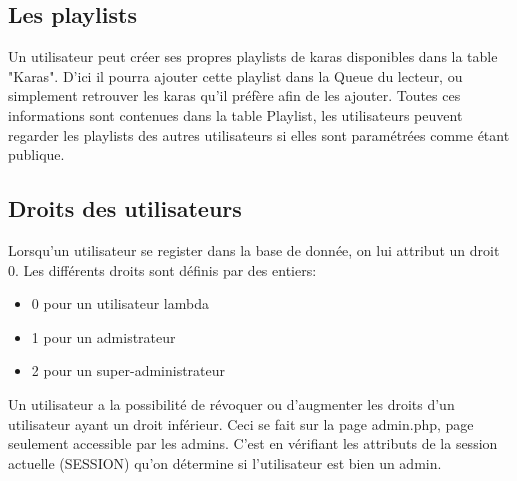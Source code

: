 \subsection{Les playlists}

Un utilisateur peut créer ses propres playlists de karas disponibles dans la table "Karas". D'ici il pourra ajouter cette playlist dans la Queue du lecteur, ou simplement retrouver les karas qu'il préfère afin de les ajouter. Toutes ces informations sont contenues dans la table Playlist, les utilisateurs peuvent regarder les playlists des autres utilisateurs si elles sont paramétrées comme étant publique.\newline

\subsection{Droits des utilisateurs}
Lorsqu'un utilisateur se register dans la base de donnée, on lui attribut un droit 0. Les différents droits sont définis par des entiers:
\begin{itemize}
	\item 0 pour un utilisateur lambda
	\item 1 pour un admistrateur
	\item 2 pour un super-administrateur
\end{itemize}
Un utilisateur a la possibilité de révoquer ou d'augmenter les droits d'un utilisateur ayant un droit inférieur. Ceci se fait sur la page admin.php, page seulement accessible par les admins. C'est en vérifiant les attributs de la session actuelle (SESSION) qu'on détermine si l'utilisateur est bien un admin.
